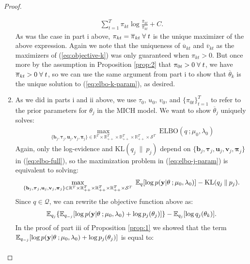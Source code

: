 \begin{proof}
\begin{enumerate}[label=\roman*.]
\begin{align*}
    \sum_{t=1}^T \pi_{kt} \log \frac{\overline{\pi}_{kt}}{\pi_{kt}} +C.
\end{align*}
As was the case in part i above, $\pi_{kt} = \overline{\pi}_{kt} \;\forall\; t$ is the unique maximizer of the above expression. Again we note that the uniqueness of $\overline{u}_{kt}$ and $\overline{v}_{kt}$ as the maximizers of (\ref{eq:objective-k}) was only guaranteed when $\pi_{kt} > 0$. But once more by the assumption in Proposition \ref{prop:2} that $\pi_{0t} >0 \;\forall\; t$, we have $\overline{\pi}_{kt} > 0 \;\forall\; t$, so we can use the same argument from part i to show that $\overline{\theta}_k$ is the unique solution to (\ref{eq:elbo-k-param}), as desired.

\item As we did in parts i and ii above, we use $\tau_0$, $u_0$, $v_0$, and $\{\pi_{0t}\}_{t=1}^T$ to refer to the prior parameters for $\theta_j$ in the MICH model. We want to show $\overline{\theta}_j$ uniquely solves: 
\begin{align}
     \max_{\{\mathbf{b}_j, \boldsymbol{\tau}_j, \mathbf{u}_j, \mathbf{v}_j, \boldsymbol{\pi}_j\} \in \mathbb{R}^T\times\mathbb{R}_{++}^T\times\mathbb{R}_{++}^T\times\mathbb{R}_{++}^T \times\mathcal{S}^T} \;  \text{ELBO}(q\:;\mu_0,\lambda_0) \label{eq:elbo-j-param}
\end{align}
Again, only the log-evidence and $\text{KL}(q_j\:\lVert\: p_j)$ depend on $\{\mathbf{b}_j, \boldsymbol{\tau}_j, \mathbf{u}_j, \mathbf{v}_j, \boldsymbol{\pi}_j\}$ in (\ref{eq:elbo-full}), so the maximization problem in (\ref{eq:elbo-j-param}) is equivalent to solving: 
\begin{align*}
     \max_{\{\mathbf{b}_j, \boldsymbol{\tau}_j, \mathbf{u}_j, \mathbf{v}_j, \boldsymbol{\pi}_j\} \in \mathbb{R}^T\times\mathbb{R}_{++}^T\times\mathbb{R}_{++}^T\times\mathbb{R}_{++}^T \times\mathcal{S}^T} \;  \mathbb{E}_q[\log p(\mathbf{y}| \theta\:; \mu_0,\lambda_0)] - \text{KL}(q_j\:\lVert\: p_j).
\end{align*}
Since $q \in \mathcal{Q}$, we can rewrite the objective function above as:
\begin{align*}
    \mathbb{E}_{q_j}\{\mathbb{E}_{q_{-j}}[\log p(\mathbf{y}| \theta\:; \mu_0,\lambda_0)+\log p_j(\theta_j)]\} - \mathbb{E}_{q_j}[\log q_j(\theta_k)].
\end{align*}
In the proof of part iii of Proposition \ref{prop:1} we showed that the term $\mathbb{E}_{q_{-j}}[\log p(\mathbf{y}| \theta\:; \mu_0,\lambda_0)+\log p_j(\theta_j)]$ is equal to:
\small
\begin{align*}

\end{align*}
\end{enumerate}
\end{proof}
